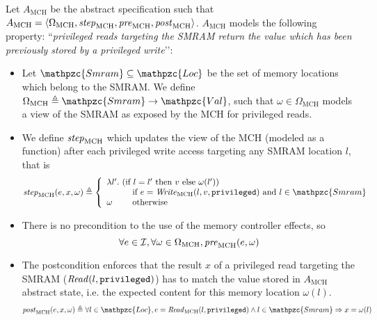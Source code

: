 \begin{example} \label{ex:mch-abs-specs} Let $A_{\mathrm{MCH}}$ be the abstract
  specification such that
  $A_{\mathrm{MCH}} = \langle \Omega_{\mathrm{MCH}}, \mathit{step}_{\mathrm{MCH}},
  \mathit{pre}_{\mathrm{MCH}}, \mathit{post}_{\mathrm{MCH}} \rangle$.
  $A_{\mathrm{MCH}}$ models the following property: ``\emph{privileged reads
    targeting the SMRAM return the value which has been previously stored by a
    privileged write}’’:
  \begin{itemize}
  \item Let $\mathpzc{Smram} \subseteq \mathpzc{Loc}$ be the set of memory
    locations which belong to the SMRAM.  We define
    $\Omega_{\mathrm{MCH}} \triangleq \mathpzc{Smram} \rightarrow
    \mathpzc{Val}$, such that $\omega \in \Omega_{\mathrm{MCH}}$ models a view
    of the SMRAM as exposed by the MCH for privileged reads.
  \item We define $\mathit{step}_{\mathrm{MCH}}$ which updates the view of the MCH
    (modeled as a function) after each privileged write access targeting any
    SMRAM location $l$, that is
    \[ \func{step}_{\mathrm{MCH}}(e, x, \omega) \triangleq \left\{
        \begin{array}{l}
          \lambda l'.  \text{ (if } l = l' \text{ then } v \text{ else } \omega(l')) \\
          \qquad\ \ \text{ if } e = \func{Write}_{\mathrm{MCH}}(l, v, \val{privileged})
          \text{ and } l \in \mathpzc{Smram} \\
          \omega \qquad \text{ otherwise}
        \end{array}
      \right.
    \]
  \item There is no precondition to the use of the memory controller effects, so
    \[ \forall e \in \mathcal{I},\forall \omega \in \Omega_{\mathrm{MCH}},
      \mathit{pre}_{\mathrm{MCH}}(e, \omega) \]
  \item The postcondition enforces that the result $x$ of a privileged read
    targeting the SMRAM ($\mathit{Read}(l, \mathtt{privileged})$) has to match the
    value stored in $A_{\mathrm{MCH}}$ abstract state, i.e. the expected content
    for this memory location $\omega(l)$.
    \[ \func{post}_{\mathrm{MCH}}(e, x, \omega) \triangleq \forall l \in
      \mathpzc{Loc}, e = \func{Read}_{\mathrm{MCH}}(l, \val{privileged}) \wedge
      l \in \mathpzc{Smram} \Rightarrow x = \omega(l)
    \]
  \end{itemize}
\end{example}

